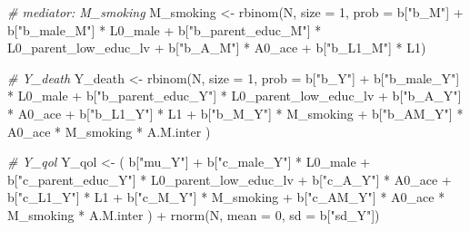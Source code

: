 \documentclass[
]{book}
\newenvironment{Shaded}{\begin{snugshade}}{\end{snugshade}}
\newcommand{\AttributeTok}[1]{\textcolor[rgb]{0.77,0.63,0.00}{#1}}
\newcommand{\CommentTok}[1]{\textcolor[rgb]{0.56,0.35,0.01}{\textit{#1}}}
\newcommand{\DecValTok}[1]{\textcolor[rgb]{0.00,0.00,0.81}{#1}}
\newcommand{\FunctionTok}[1]{\textcolor[rgb]{0.00,0.00,0.00}{#1}}
\newcommand{\NormalTok}[1]{#1}
\newcommand{\OtherTok}[1]{\textcolor[rgb]{0.56,0.35,0.01}{#1}}
\newcommand{\SpecialCharTok}[1]{\textcolor[rgb]{0.00,0.00,0.00}{#1}}
\newcommand{\StringTok}[1]{\textcolor[rgb]{0.31,0.60,0.02}{#1}}
\begin{document}
\begin{Shaded}
\begin{Highlighting}[]
  \CommentTok{\# mediator: M\_smoking}
\NormalTok{  M\_smoking }\OtherTok{\textless{}{-}} \FunctionTok{rbinom}\NormalTok{(N, }\AttributeTok{size =} \DecValTok{1}\NormalTok{, }\AttributeTok{prob =}\NormalTok{ b[}\StringTok{"b\_M"}\NormalTok{] }\SpecialCharTok{+} 
\NormalTok{                        b[}\StringTok{"b\_male\_M"}\NormalTok{] }\SpecialCharTok{*}\NormalTok{ L0\_male }\SpecialCharTok{+} 
\NormalTok{                        b[}\StringTok{"b\_parent\_educ\_M"}\NormalTok{] }\SpecialCharTok{*}\NormalTok{ L0\_parent\_low\_educ\_lv }\SpecialCharTok{+} 
\NormalTok{                        b[}\StringTok{"b\_A\_M"}\NormalTok{] }\SpecialCharTok{*}\NormalTok{ A0\_ace }\SpecialCharTok{+}
\NormalTok{                        b[}\StringTok{"b\_L1\_M"}\NormalTok{] }\SpecialCharTok{*}\NormalTok{ L1) }

  \CommentTok{\# Y\_death }
\NormalTok{  Y\_death }\OtherTok{\textless{}{-}} \FunctionTok{rbinom}\NormalTok{(N, }\AttributeTok{size =} \DecValTok{1}\NormalTok{, }\AttributeTok{prob =}\NormalTok{ b[}\StringTok{"b\_Y"}\NormalTok{] }\SpecialCharTok{+} 
\NormalTok{                      b[}\StringTok{"b\_male\_Y"}\NormalTok{] }\SpecialCharTok{*}\NormalTok{ L0\_male }\SpecialCharTok{+} 
\NormalTok{                      b[}\StringTok{"b\_parent\_educ\_Y"}\NormalTok{] }\SpecialCharTok{*}\NormalTok{ L0\_parent\_low\_educ\_lv }\SpecialCharTok{+} 
\NormalTok{                      b[}\StringTok{"b\_A\_Y"}\NormalTok{] }\SpecialCharTok{*}\NormalTok{ A0\_ace }\SpecialCharTok{+} 
\NormalTok{                      b[}\StringTok{"b\_L1\_Y"}\NormalTok{] }\SpecialCharTok{*}\NormalTok{ L1 }\SpecialCharTok{+}
\NormalTok{                      b[}\StringTok{"b\_M\_Y"}\NormalTok{] }\SpecialCharTok{*}\NormalTok{ M\_smoking }\SpecialCharTok{+}
\NormalTok{                      b[}\StringTok{"b\_AM\_Y"}\NormalTok{] }\SpecialCharTok{*}\NormalTok{ A0\_ace }\SpecialCharTok{*}\NormalTok{ M\_smoking }\SpecialCharTok{*}\NormalTok{ A.M.inter ) }
  
  \CommentTok{\# Y\_qol }
\NormalTok{  Y\_qol }\OtherTok{\textless{}{-}}\NormalTok{ ( b[}\StringTok{"mu\_Y"}\NormalTok{] }\SpecialCharTok{+} 
\NormalTok{               b[}\StringTok{"c\_male\_Y"}\NormalTok{] }\SpecialCharTok{*}\NormalTok{ L0\_male }\SpecialCharTok{+} 
\NormalTok{               b[}\StringTok{"c\_parent\_educ\_Y"}\NormalTok{] }\SpecialCharTok{*}\NormalTok{ L0\_parent\_low\_educ\_lv }\SpecialCharTok{+}
\NormalTok{               b[}\StringTok{"c\_A\_Y"}\NormalTok{] }\SpecialCharTok{*}\NormalTok{ A0\_ace }\SpecialCharTok{+}
\NormalTok{               b[}\StringTok{"c\_L1\_Y"}\NormalTok{] }\SpecialCharTok{*}\NormalTok{ L1 }\SpecialCharTok{+}
\NormalTok{               b[}\StringTok{"c\_M\_Y"}\NormalTok{] }\SpecialCharTok{*}\NormalTok{ M\_smoking }\SpecialCharTok{+} 
\NormalTok{               b[}\StringTok{"c\_AM\_Y"}\NormalTok{] }\SpecialCharTok{*}\NormalTok{ A0\_ace }\SpecialCharTok{*}\NormalTok{ M\_smoking }\SpecialCharTok{*}\NormalTok{ A.M.inter ) }\SpecialCharTok{+} 
    \FunctionTok{rnorm}\NormalTok{(N, }\AttributeTok{mean =} \DecValTok{0}\NormalTok{, }\AttributeTok{sd =}\NormalTok{ b[}\StringTok{"sd\_Y"}\NormalTok{])}
  

\end{Highlighting}
\end{Shaded}
\end{document}
